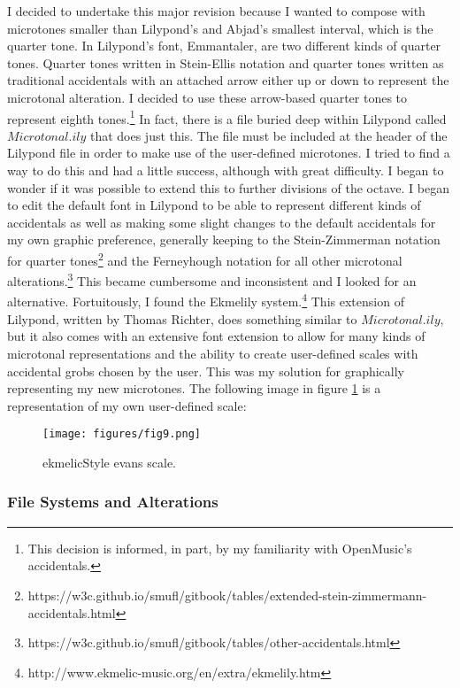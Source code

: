 I decided to undertake this major revision because I wanted to compose with microtones smaller than Lilypond’s and Abjad’s smallest interval, which is the quarter tone. In Lilypond’s font, Emmantaler, are two different kinds of quarter tones. Quarter tones written in Stein-Ellis notation and quarter tones written as traditional accidentals with an attached arrow either up or down to represent the microtonal alteration. I decided to use these arrow-based quarter tones to represent eighth tones.\footnote{This decision is informed, in part, by my familiarity with OpenMusic's accidentals.} In fact, there is a file buried deep within Lilypond called $Microtonal.ily$ that does just this. The file must be included at the header of the Lilypond file in order to make use of the user-defined microtones. I tried to find a way to do this and had a little success, although with great difficulty. I began to wonder if it was possible to extend this to further divisions of the octave. I began to edit the default font in Lilypond to be able to represent different kinds of accidentals as well as making some slight changes to the default accidentals for my own graphic preference, generally keeping to the Stein-Zimmerman notation for quarter tones\footnote{https://w3c.github.io/smufl/gitbook/tables/extended-stein-zimmermann-accidentals.html} and the Ferneyhough notation for all other microtonal alterations.\footnote{https://w3c.github.io/smufl/gitbook/tables/other-accidentals.html} This became cumbersome and inconsistent and I looked for an alternative. Fortuitously, I found the Ekmelily system.\footnote{http://www.ekmelic-music.org/en/extra/ekmelily.htm} This extension of Lilypond, written by Thomas Richter, does something similar to $Microtonal.ily$, but it also comes with an extensive font extension to allow for many kinds of microtonal representations and the ability to create user-defined scales with accidental grobs chosen by the user. This was my solution for graphically representing my new microtones. The following image in figure \ref{fig:scale} is a representation of my own user-defined scale:

\singlespace
\begin{figure}[h]
  \texttt{[image: figures/fig9.png]}
  \caption{ekmelicStyle evans scale.}
  \label{fig:scale}
\end{figure}
\doublespace

\subsubsection{File Systems and Alterations}

